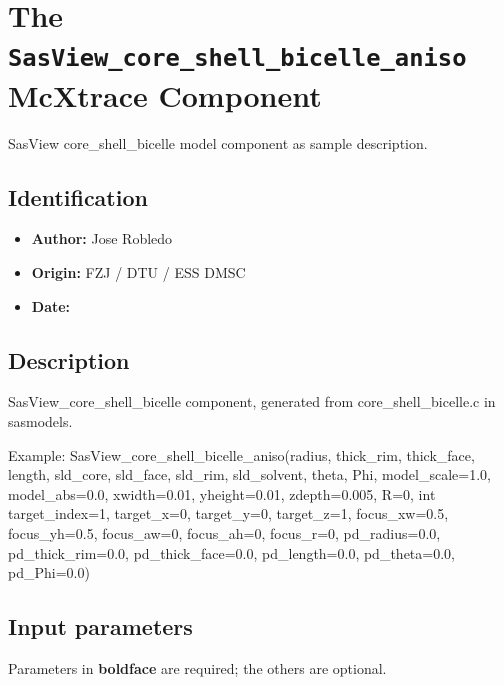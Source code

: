 \section{The \texttt{SasView\_core\_shell\_bicelle\_aniso} McXtrace Component}
SasView core\_shell\_bicelle model component as sample description.

\subsection*{Identification}
\begin{itemize}
  \item \textbf{Author:} Jose Robledo
  \item \textbf{Origin:} FZJ / DTU / ESS DMSC
  \item \textbf{Date:} 
\end{itemize}

\subsection*{Description}
SasView\_core\_shell\_bicelle component, generated from core\_shell\_bicelle.c in sasmodels.

Example: SasView\_core\_shell\_bicelle\_aniso(radius, thick\_rim, thick\_face, length, sld\_core, sld\_face, sld\_rim, sld\_solvent, theta, Phi, model\_scale=1.0, model\_abs=0.0, xwidth=0.01, yheight=0.01, zdepth=0.005, R=0, int target\_index=1, target\_x=0, target\_y=0, target\_z=1, focus\_xw=0.5, focus\_yh=0.5, focus\_aw=0, focus\_ah=0, focus\_r=0, pd\_radius=0.0, pd\_thick\_rim=0.0, pd\_thick\_face=0.0, pd\_length=0.0, pd\_theta=0.0, pd\_Phi=0.0)

\subsection*{Input parameters}
Parameters in \textbf{boldface} are required; the others are optional.

